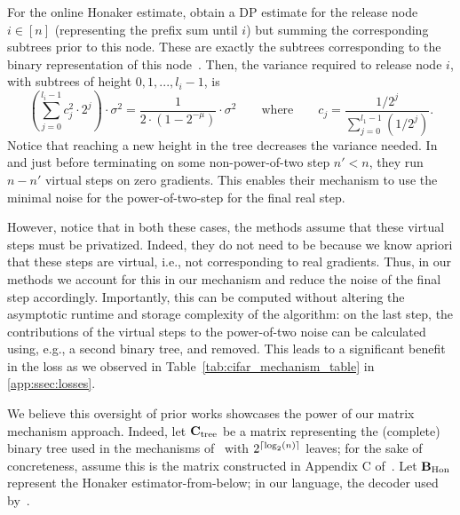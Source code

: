 \documentclass{article} %
\theoremstyle{named}
\begin{document}
For the online Honaker estimate, \citet{honaker_trick} obtain a DP estimate for the release node $i \in [n]$ (representing the prefix sum until $i$) but summing the corresponding subtrees prior to this node. These are exactly the subtrees corresponding to the binary representation of this node~\citep{honaker_trick}. 
Then, the variance required to release node $i$, with subtrees of height $0, 1, ..., l_i-1$, is
\begin{equation*}
    \left(\sum\limits_{j=0}^{l_i-1} c_j^2\cdot 2^j\right)\cdot\sigma^2
    = \frac{1}{2\cdot(1-2^{-\mu})}\cdot \sigma^2
    \qquad \text{where} \qquad
    c_j=\frac{1/2^j}{\sum\limits_{j=0}^{l_1-1} (1/2^{j})}.
\end{equation*}
Notice that reaching a new height in the tree decreases the variance needed.
In~\citet{kairouz2021practical} and just before terminating on some non-power-of-two step $n'<n$, they run $n-n'$ virtual steps on zero gradients. This enables their mechanism to use the minimal noise for the power-of-two-step for the final real step. 

However, notice that in both these cases, the methods assume that these virtual steps must be privatized. Indeed, they do not need to be because we know apriori that these steps are virtual, i.e., not corresponding to real gradients. Thus, in our methods we account for this in our mechanism and reduce the noise of the final step accordingly. Importantly, this can be computed without altering the asymptotic runtime and storage complexity of the algorithm: on the last step, the contributions of the virtual steps to the power-of-two noise can be calculated using, e.g., a second binary tree, and removed. This leads to a significant benefit in the loss as we observed in Table~\ref{tab:cifar_mechanism_table} in \cref{app:ssec:losses}.

\newcommand{\treeencoder}{\ensuremath{\bfC_{\text{tree}}}}
\newcommand{\hondecoder}{\ensuremath{\bfB_{\text{Hon}}}}
\newcommand{\pwrtwo}{\ensuremath{2^{\lceil \log_2(\dimension)\rceil}}}
We believe this oversight of prior works showcases the power of our matrix mechanism approach. Indeed, let $\treeencoder$  be a matrix representing the (complete) binary tree used in the mechanisms of~\citet{honaker_trick,kairouz2021practical} with $\pwrtwo$ leaves; for the sake of concreteness, assume this is the matrix constructed in Appendix C of~\citet{denisov22matfact}. Let $\hondecoder$ represent the Honaker estimator-from-below; in our language, the decoder used by~\citep{kairouz2021practical}.
\end{document}
